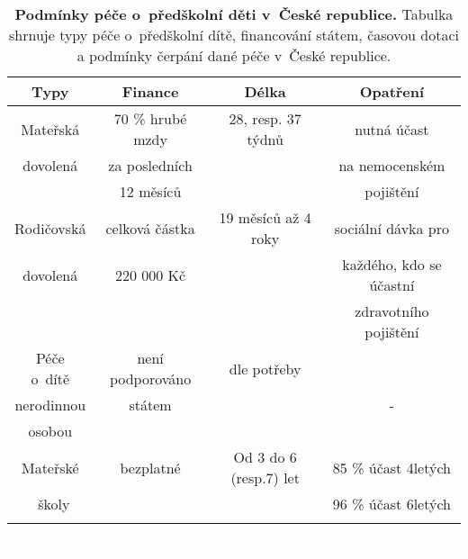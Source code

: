 \begin{spacing}{1.0}
\begin{table}[h!]
	\center
	\small
	\begin{center}
	\begin{tabular}{|c|c|c|c|}
		\hline
		\rowcolor{grey}
		\textbf{Typy}	 & \textbf{Finance}		& \textbf{Délka}		& \textbf{Opatření}	 \\
		\hline
		\hline
		Mateřská & 70 \% hrubé mzdy 		& 28, resp. 37 týdnů	& nutná účast  			\\ \rowcolor{grey!10}
		dovolená & za posledních	 		& 						& na nemocenském 		\\ \rowcolor{grey!10}
				 & 12 měsíců				& 						& pojištění				\\ \rowcolor{grey!10}
		\hline
		Rodičovská 	& celková částka  		& 19 měsíců až 4 roky	& sociální dávka pro 	\\ \rowcolor{grey!10}
		dovolená 	& 220 000 Kč			& 					& každého, kdo se účastní	\\ \rowcolor{grey!10}
					&						&						& zdravotního pojištění \\ \rowcolor{grey!10}
		\hline
		Péče o~dítě & není podporováno		& dle potřeby			&   					\\ \rowcolor{grey!10}
		nerodinnou	& státem				&						&	-					\\ \rowcolor{grey!10}
		osobou 		&						&						&						\\ \rowcolor{grey!10}
		\hline
		Mateřské	& 	bezplatné 			& Od 3 do 6 (resp.7) let & 85 \% účast 4letých 	\\ \rowcolor{grey!10}\
		školy 		& 						&  						 & 96 \% účast 6letých 	\\ \rowcolor{grey!10}
		\hline
	\end{tabular}
	\end{center}
	\label{tab:peceCR}
	\caption{
		\textbf{Podmínky péče o~předškolní děti v~České republice.}
				Tabulka shrnuje typy péče o~předškolní dítě, financování státem, časovou dotaci a podmínky čerpání dané péče v~České republice.
	}
\end{table}
\end{spacing}	
\vspace{10cm}
\textcolor{white}{.}


